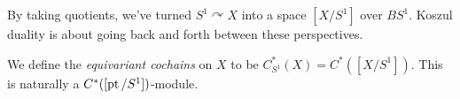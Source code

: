 \documentclass{article}
\begin{document}
By taking quotients, we've turned $S^1 \curvearrowright X$ into a space $[X / S^1]$ over $BS^1$.
Koszul duality is about going back and forth between these perspectives.

\begin{dfn}
  We define the \emph{equivariant cochains} on $X$ to be $C^*_{S^1}(X) = C^*([X / S^1])$.
  This is naturally a $C^*([\operatorname{pt} / S^1])$-module.
\end{dfn}
\end{document}
